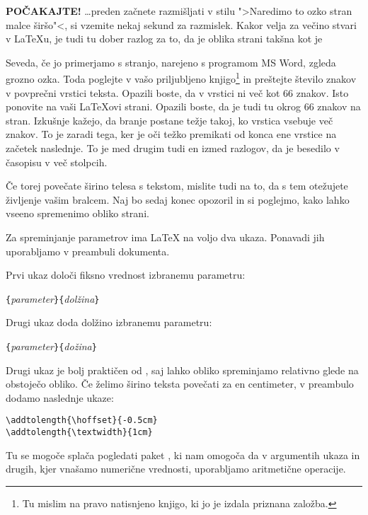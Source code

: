 \textbf{POČAKAJTE!} \ldots preden začnete razmišljati v stilu 
">Naredimo to ozko stran malce  širšo"<, si vzemite nekaj sekund za razmislek. 
Kakor velja za večino stvari v \LaTeX{}u, je tudi tu dober razlog za to, da je oblika 
strani takšna kot je 

Seveda, če jo primerjamo s stranjo, narejeno s programom MS Word, zgleda grozno ozka. 
Toda poglejte v vašo priljubljeno knjigo\footnote{Tu mislim na pravo natisnjeno knjigo, ki jo je izdala priznana založba.} 
in preštejte število znakov v povprečni vrstici teksta. Opazili boste, da v vrstici ni več kot 
66 znakov. Isto ponovite na vaši \LaTeX{}ovi strani. Opazili boste, da je tudi tu okrog 66 znakov
na stran.  Izkušnje kažejo, da branje postane težje takoj, ko vrstica vsebuje
več znakov. To je zaradi tega, ker je oči težko premikati od konca ene vrstice 
na začetek naslednje. To je med drugim tudi en izmed razlogov, da je besedilo
v časopisu v več stolpcih.

Če torej povečate širino telesa s tekstom, mislite tudi na to, 
da s tem otežujete življenje vašim bralcem. Naj bo sedaj konec opozoril 
in si poglejmo, kako lahko vseeno spremenimo obliko strani.
 
Za spreminjanje parametrov ima \LaTeX{} na voljo dva ukaza. Ponavadi jih uporabljamo v 
preambuli dokumenta.

Prvi ukaz določi fiksno vrednost izbranemu parametru:
\begin{lscommand}
\verb|{|\emph{parameter}\verb|}{|\emph{dolžina}\verb|}|
\end{lscommand}

Drugi ukaz doda dolžino izbranemu parametru: 
\begin{lscommand}
\verb|{|\emph{parameter}\verb|}{|\emph{dožina}\verb|}|
\end{lscommand} 

Drugi ukaz je bolj praktičen od , saj 
lahko obliko spreminjamo relativno glede na obstoječo obliko.
Če želimo širino teksta povečati za en centimeter, v preambulo dodamo
naslednje ukaze:
\begin{code}
\verb|\addtolength{\hoffset}{-0.5cm}|\\
\verb|\addtolength{\textwidth}{1cm}|
\end{code}

Tu se mogoče splača pogledati paket , ki nam omogoča
da v argumentih ukaza  in drugih, kjer vnašamo numerične vrednosti, uporabljamo aritmetične operacije.

